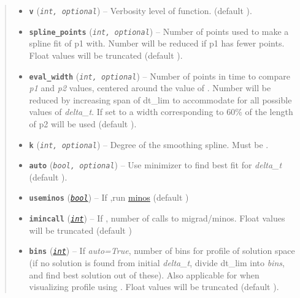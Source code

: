 \documentclass[letterpaper,10pt,english]{sphinxhowto}
\begin{document}
\begin{fulllineitems}
\begin{quote}
\begin{description}
\begin{itemize}
\item {} 
\textbf{\texttt{v}} (\emph{\texttt{int, optional}}) -- Verbosity level of function.  (default ).

\item {} 
\textbf{\texttt{spline\_points}} (\emph{\texttt{int, optional}}) -- Number of points used to make a spline fit of p1 with. Number
will be reduced if p1 has fewer points. Float values will be
truncated (default ).

\item {} 
\textbf{\texttt{eval\_width}} (\emph{\texttt{int, optional}}) -- Number of points in time to compare \emph{p1} and \emph{p2} values,
centered around the value of . Number will be
reduced by increasing span of dt\_lim to accommodate for all
possible values of \emph{delta\_t}. If set to  a
width corresponding to 60\% of the length of p2 will be used
(default ).

\item {} 
\textbf{\texttt{k}} (\emph{\texttt{int, optional}}) -- Degree of the smoothing spline. Must be .

\item {} 
\textbf{\texttt{auto}} (\emph{\texttt{bool, optional}}) -- Use minimizer to find best fit for \emph{delta\_t} (default ).

\item {} 
\textbf{\texttt{useminos}} (\href{https://docs.python.org/library/functions.html\#bool}{\emph{\texttt{bool}}}) -- If ,run
\href{http://iminuit.readthedocs.org/en/latest/api.html\#iminuit.Minuit.minos}{minos}
(default )

\item {} 
\textbf{\texttt{imincall}} (\href{https://docs.python.org/library/functions.html\#int}{\emph{\texttt{int}}}) -- If , number of calls to migrad/minos. Float values
will be truncated (default )

\item {} 
\textbf{\texttt{bins}} (\href{https://docs.python.org/library/functions.html\#int}{\emph{\texttt{int}}}) -- If \emph{auto=True}, number of bins for profile of solution space (if
no solution is found from initial \emph{delta\_t}, divide dt\_lim into
\emph{bins}, and find best solution out of these). Also applicable for
when visualizing profile using . Float values will
be truncated (default ).


\end{itemize}
\end{description}
\end{quote}
\end{fulllineitems}
\end{document}
